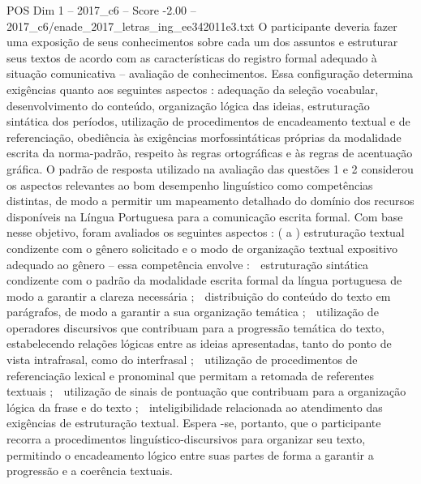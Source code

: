 \begin{textsample}{POS Dim 1 – 2017\_c6 – Score -2.00 – 2017\_c6/enade\_2017\_letras\_ing\_ee342011e3.txt}
O participante deveria fazer uma exposição de seus conhecimentos sobre cada um dos assuntos e estruturar seus textos de acordo com as características do registro formal adequado à situação comunicativa – avaliação de conhecimentos.
Essa configuração determina exigências quanto aos seguintes aspectos : adequação da seleção vocabular, desenvolvimento do conteúdo, organização lógica das ideias, estruturação sintática dos períodos, utilização de procedimentos de encadeamento textual e de referenciação, obediência às exigências morfossintáticas próprias da modalidade escrita da norma-padrão, respeito às regras ortográficas e às regras de acentuação gráfica.
O padrão de resposta utilizado na avaliação das questões 1 e 2 considerou os aspectos relevantes ao bom desempenho linguístico como competências distintas, de modo a permitir um mapeamento detalhado do domínio dos recursos disponíveis na Língua Portuguesa para a comunicação escrita formal.
Com base nesse objetivo, foram avaliados os seguintes aspectos : ( a ) estruturação textual condizente com o gênero solicitado e o modo de organização textual expositivo adequado ao gênero – essa competência envolve :  estruturação sintática condizente com o padrão da modalidade escrita formal da língua portuguesa de modo a garantir a clareza necessária ;  distribuição do conteúdo do texto em parágrafos, de modo a garantir a sua organização temática ;  utilização de operadores discursivos que contribuam para a progressão temática do texto, estabelecendo relações lógicas entre as ideias apresentadas, tanto do ponto de vista intrafrasal, como do interfrasal ;  utilização de procedimentos de referenciação lexical e pronominal que permitam a retomada de referentes textuais ;  utilização de sinais de pontuação que contribuam para a organização lógica da frase e do texto ;  inteligibilidade relacionada ao atendimento das exigências de estruturação textual.
Espera -se, portanto, que o participante recorra a procedimentos linguístico-discursivos para organizar seu texto, permitindo o encadeamento lógico entre suas partes de forma a garantir a progressão e a coerência textuais.

\end{textsample}
